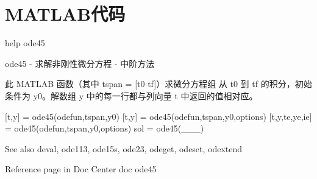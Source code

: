 \newpage\appendix
\section{MATLAB代码}
\begin{matlab}
help ode45
\end{matlab}
\begin{script}
ode45 - 求解非刚性微分方程 - 中阶方法

    此 MATLAB 函数（其中 tspan = [t0 tf]）求微分方程组 从 t0 到 tf 的积分，初始条件为 y0。解数组 y 中的每一行都与列向量 t
    中返回的值相对应。

    [t,y] = ode45(odefun,tspan,y0)
    [t,y] = ode45(odefun,tspan,y0,options)
    [t,y,te,ye,ie] = ode45(odefun,tspan,y0,options)
    sol = ode45(___)

    See also deval, ode113, ode15s, ode23, odeget, odeset, odextend

    Reference page in Doc Center
       doc ode45
\end{script}
